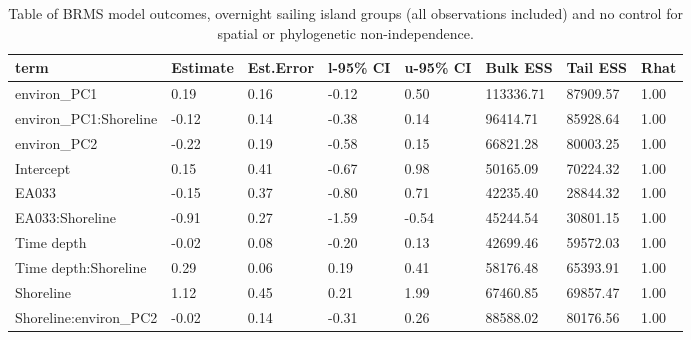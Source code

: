 \begin{table}[ht]
\centering
\begin{tabular}{p{3cm}p{1.35cm}p{1.35cm}p{1.35cm}p{1.35cm}p{1.35cm}p{1.35cm}p{1.35cm}}
  \toprule
term & Estimate & Est.Error & l-95\% CI & u-95\% CI & Bulk ESS & Tail ESS & Rhat \\ 
  \midrule
environ\_PC1 & 0.19 & 0.16 & -0.12 & 0.50 & 113336.71 & 87909.57 & 1.00 \\ 
  environ\_PC1:Shoreline & -0.12 & 0.14 & -0.38 & 0.14 & 96414.71 & 85928.64 & 1.00 \\ 
  environ\_PC2 & -0.22 & 0.19 & -0.58 & 0.15 & 66821.28 & 80003.25 & 1.00 \\ 
  Intercept & 0.15 & 0.41 & -0.67 & 0.98 & 50165.09 & 70224.32 & 1.00 \\ 
  EA033 & -0.15 & 0.37 & -0.80 & 0.71 & 42235.40 & 28844.32 & 1.00 \\ 
  EA033:Shoreline & -0.91 & 0.27 & -1.59 & -0.54 & 45244.54 & 30801.15 & 1.00 \\ 
  Time depth & -0.02 & 0.08 & -0.20 & 0.13 & 42699.46 & 59572.03 & 1.00 \\ 
  Time depth:Shoreline & 0.29 & 0.06 & 0.19 & 0.41 & 58176.48 & 65393.91 & 1.00 \\ 
  Shoreline & 1.12 & 0.45 & 0.21 & 1.99 & 67460.85 & 69857.47 & 1.00 \\ 
  Shoreline:environ\_PC2 & -0.02 & 0.14 & -0.31 & 0.26 & 88588.02 & 80176.56 & 1.00 \\ 
   \bottomrule
\end{tabular}
\caption{Table of BRMS model outcomes, overnight sailing island groups (all observations included) and no control for spatial or phylogenetic non-independence.} 
\label{BRMS_effects_SBZR_control_none}
\end{table}
